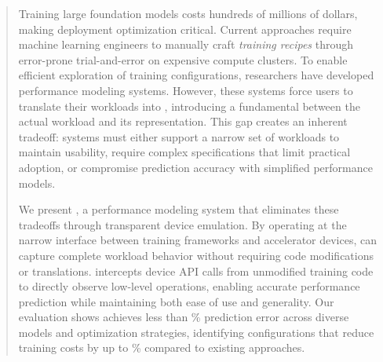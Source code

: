\begin{abstract}

Training large foundation models costs hundreds of millions of dollars, making deployment optimization critical. Current approaches require machine learning engineers to manually craft \textit{training recipes} through  error-prone trial-and-error on expensive compute clusters. To enable efficient exploration of training configurations, researchers have developed performance modeling systems. However, these systems force users to translate their workloads into \csl, introducing a fundamental \textit{\semg} between the actual workload and its representation. This gap creates an inherent tradeoff: systems must either support a narrow set of workloads to maintain usability, require complex specifications that limit practical adoption, or compromise prediction accuracy with simplified performance models.

We present \sysname, a performance modeling system that eliminates these tradeoffs through transparent device emulation. By operating at the narrow interface between training frameworks and accelerator devices, \sysname can capture complete workload behavior without requiring code modifications or translations. \sysname intercepts device API calls from unmodified training code to directly observe low-level operations, enabling accurate performance prediction while maintaining both ease of use and generality. Our evaluation shows \sysname achieves less than \evalpe{}\% prediction error across diverse models and optimization strategies, identifying configurations that reduce training costs by up to \evaltc{}\% compared to existing approaches.







\end{abstract}
